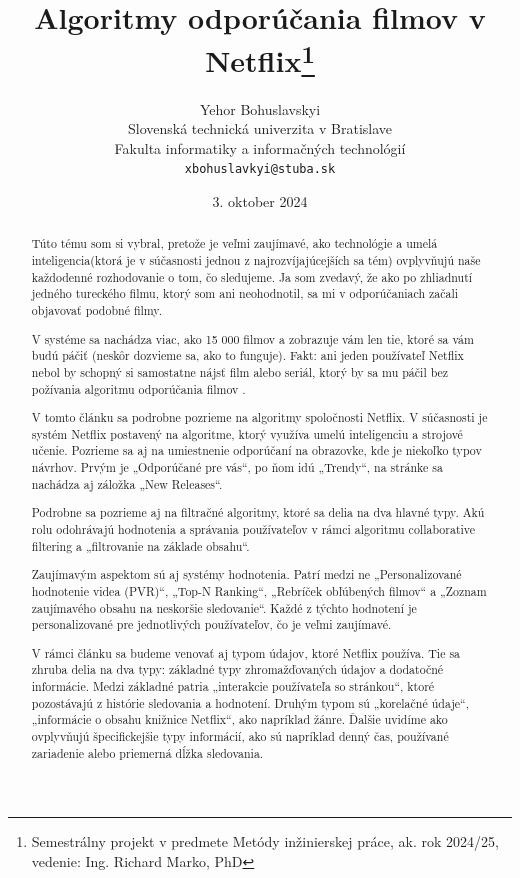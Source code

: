 \documentclass[10pt,twocolumn,twoside,slovak,a4paper]{article}
\title{Algoritmy odporúčania filmov v Netflix\thanks{Semestrálny projekt v predmete Metódy inžinierskej práce, ak. rok 2024/25, vedenie: Ing. Richard Marko, PhD}}
\author{Yehor Bohuslavskyi\\[2pt]
	{\small Slovenská technická univerzita v Bratislave}\\
	{\small Fakulta informatiky a informačných technológií}\\
	{\small \texttt{xbohuslavkyi@stuba.sk}}
	}
\date{\small 3. oktober 2024}
\begin{document}
\maketitle

\begin{abstract}
Túto tému som si vybral, pretože je veľmi zaujímavé, ako technológie a umelá inteligencia(ktorá je v súčasnosti jednou z najrozvíjajúcejších sa tém) ovplyvňujú naše každodenné rozhodovanie o tom, čo sledujeme. Ja som zvedavý, že ako po zhliadnutí jedného tureckého filmu, ktorý som ani neohodnotil, sa mi v odporúčaniach začali objavovať podobné filmy. 

V systéme sa nachádza viac, ako 15 000 filmov a zobrazuje vám len tie, ktoré sa vám budú páčiť (neskôr dozvieme sa, ako to funguje). Fakt: ani jeden používateľ Netflix nebol by schopný si samostatne nájsť film alebo seriál, ktorý by sa mu páčil bez požívania algoritmu odporúčania filmov \cite{netflixRecAlgorithm}.
 
V tomto článku sa podrobne pozrieme na algoritmy spoločnosti Netflix. V súčasnosti je systém Netflix postavený na algoritme, ktorý využíva umelú inteligenciu a strojové učenie. Pozrieme sa aj na umiestnenie odporúčaní na obrazovke, kde je niekoľko typov návrhov. Prvým je „Odporúčané pre vás“, po ňom idú „Trendy“, na stránke sa nachádza aj záložka „New Releases“.

Podrobne sa pozrieme aj na filtračné algoritmy, ktoré sa delia na dva hlavné typy. Akú rolu odohrávajú hodnotenia a správania používateľov v rámci algoritmu collaborative filtering a „filtrovanie na základe obsahu“.

Zaujímavým aspektom sú aj systémy hodnotenia. Patrí medzi ne „Personalizované hodnotenie videa (PVR)“, „Top-N Ranking“, „Rebríček obľúbených filmov“ a „Zoznam zaujímavého obsahu na neskoršie sledovanie“. Každé z týchto hodnotení je personalizované pre jednotlivých používateľov, čo je veľmi zaujímavé.

V rámci článku sa budeme venovať aj typom údajov, ktoré Netflix používa. Tie sa zhruba delia na dva typy: základné typy zhromažďovaných údajov a dodatočné informácie. Medzi základné patria „interakcie používateľa so stránkou“, ktoré pozostávajú z histórie sledovania a hodnotení. Druhým typom sú „korelačné údaje“, „informácie o obsahu knižnice Netflix“, ako napríklad žánre. Ďalšie uvidíme ako ovplyvňujú  špecifickejšie typy informácií, ako sú napríklad denný čas, používané zariadenie alebo priemerná dĺžka sledovania.

\end{abstract}
\end{document}

